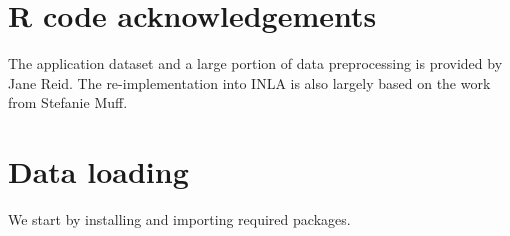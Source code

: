\hypertarget{r-code-acknowledgements}{%
\section*{R code acknowledgements}\label{r-code-acknowledgements}}

The application dataset and a large portion of data preprocessing is
provided by Jane Reid. The re-implementation into INLA is also largely
based on the work from Stefanie Muff.

\hypertarget{data-loading}{%
\section*{Data loading}\label{data-loading}}

We start by installing and importing required packages.

